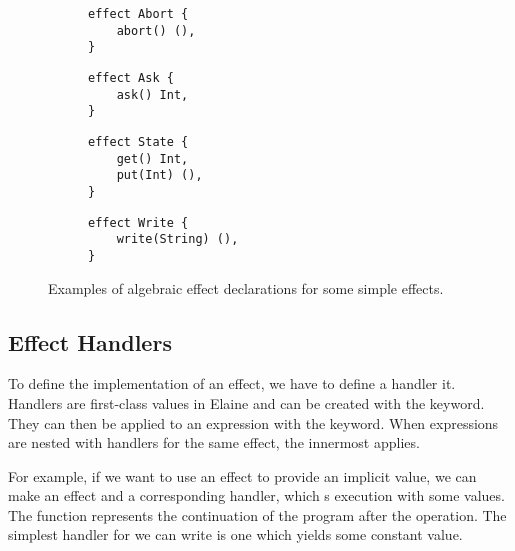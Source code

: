 \begin{figure}[htbp]
    \begin{subfigure}{0.5\textwidth}
        \begin{lstlisting}[style=fancy]
effect Abort {
    abort() (),
}
        \end{lstlisting}
    \end{subfigure}
    \begin{subfigure}{0.5\textwidth}
        \begin{lstlisting}[style=fancy]
effect Ask {
    ask() Int,
}
        \end{lstlisting}
    \end{subfigure}
    \begin{subfigure}{0.5\textwidth}
        \begin{lstlisting}[style=fancy]
effect State {
    get() Int,
    put(Int) (),
}
        \end{lstlisting}
    \end{subfigure}
    \begin{subfigure}{0.5\textwidth}
        \begin{lstlisting}[style=fancy]
effect Write {
    write(String) (),
}

        \end{lstlisting}
    \end{subfigure}
    \caption{Examples of algebraic effect declarations for some simple effects.}
    \label{fig:effect_decls}
\end{figure}

\subsection{Effect Handlers}\label{sec:alghandlers}

To define the implementation of an effect, we have to define a handler it. Handlers are first-class values in Elaine and can be created with the  keyword. They can then be applied to an expression with the  keyword. When  expressions are nested with handlers for the same effect, the innermost  applies.

For example, if we want to use an effect to provide an implicit value, we can make an effect  and a corresponding handler, which s execution with some values. The  function represents the continuation of the program after the operation. The simplest handler for  we can write is one which yields some constant value.

